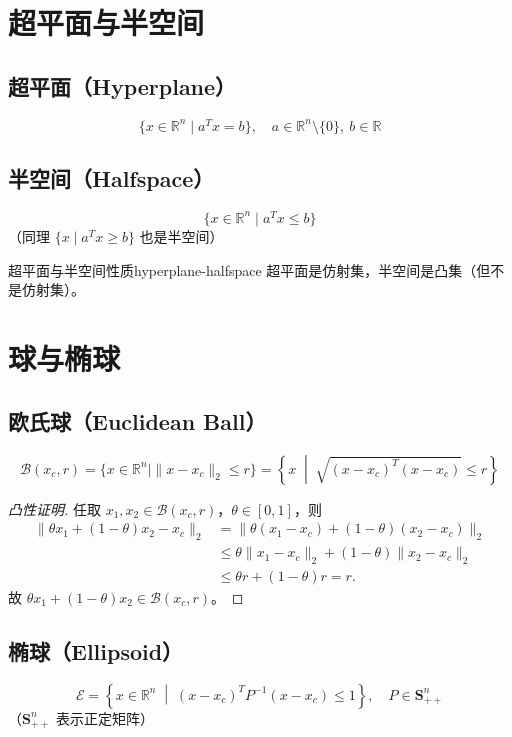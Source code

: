 \documentclass[11pt,a4paper]{article}
\begin{document}
\section{超平面与半空间}

\subsection{超平面（Hyperplane）}
\[
\{ x \in \mathbb{R}^n \mid a^T x = b \},\quad a \in \mathbb{R}^n \setminus \{0\},\ b \in \mathbb{R}
\]

\subsection{半空间（Halfspace）}
\[
\{ x \in \mathbb{R}^n \mid a^T x \leq b \}
\]
（同理 $\{ x \mid a^T x \geq b \}$ 也是半空间）

\begin{remark}{超平面与半空间性质}{hyperplane-halfspace}
超平面是仿射集，半空间是凸集（但不是仿射集）。
\end{remark}

\section{球与椭球}

\subsection{欧氏球（Euclidean Ball）}
\[
\mathcal{B}(x_c, r) = \{ x \in \mathbb{R}^n \mid \|x - x_c\|_2 \leq r \}
= \left\{ x \;\middle|\; \sqrt{(x - x_c)^T (x - x_c)} \leq r \right\}
\]

\begin{proof}[凸性证明]
任取 $x_1, x_2 \in \mathcal{B}(x_c, r)$，$\theta \in [0,1]$，则
\begin{align*}
\|\theta x_1 + (1-\theta)x_2 - x_c\|_2
&= \|\theta(x_1 - x_c) + (1-\theta)(x_2 - x_c)\|_2 \\
&\leq \theta \|x_1 - x_c\|_2 + (1-\theta)\|x_2 - x_c\|_2 \\
&\leq \theta r + (1-\theta)r = r.
\end{align*}
故 $\theta x_1 + (1-\theta)x_2 \in \mathcal{B}(x_c, r)$。
\end{proof}

\subsection{椭球（Ellipsoid）}
\[
\mathcal{E} = \left\{ x \in \mathbb{R}^n \;\middle|\; (x - x_c)^T P^{-1} (x - x_c) \leq 1 \right\},\quad P \in \mathbf{S}_{++}^n
\]
（$\mathbf{S}_{++}^n$ 表示正定矩阵）
\end{document}
